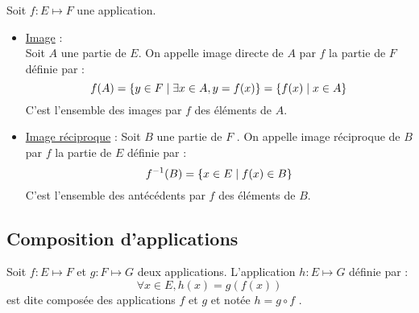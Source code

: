 \begin{defprop}
    Soit \(f : E \mapsto F\) une application.
    \begin{itemize}
        \item \underline{Image} : \\
        Soit \(A\) une partie de \(E\). On appelle image directe de \(A\) par \(f\) la partie de \(F\) définie par :
        \[f(A) = \left\lbrace y \in F \;\middle|\; \exists x \in A,y = f(x)\right\rbrace = \left\lbrace f(x)\;\middle|\; x \in A\right\rbrace\]
        C’est l’ensemble des images par \(f\) des éléments de \(A\).
        \item \underline{Image réciproque} :
        Soit \(B\) une partie de \(F\) . On appelle image réciproque de \(B\) par \(f\) la partie de \(E\) définie par :
        \[f^{-1}(B) = \left\lbrace x\in E\;\middle|\; f(x) \in B\right\rbrace\]
        C’est l’ensemble des antécédents par \(f\) des éléments de \(B\).
    \end{itemize}
\end{defprop}   

\subsection{Composition d’applications}
\begin{defprop}  
Soit \(f : E \mapsto F\) et \(g : F \mapsto G\) deux applications. L’application \(h : E \mapsto G\) définie par :
\[\forall x \in E, h(x) = g (f (x))\]
est dite composée des applications \(f\) et \(g\) et notée \(h = g \circ f\) .
\end{defprop}

